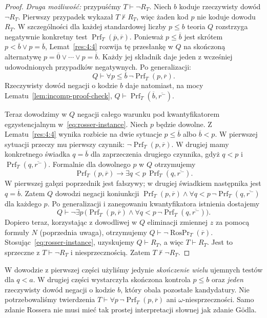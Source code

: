 \begin{proof}
\emph{Druga możliwość:} przypuśćmy $T\vdash\neg R_T$.
Niech $b$ koduje rzeczywisty dowód $\neg R_T$.
Pierwszy przypadek wykazał $T\nvdash R_T$,
więc żaden kod $p$ nie koduje dowodu $R_T$.
W szczególności dla każdej standardowej liczby $p\le b$
teoria $Q$ rozstrzyga negatywnie konkretny test
$\operatorname{Prf}_T(\overline p,\overline r)$.
Ponieważ $p\le\overline b$ jest skrótem
$p<\overline b\lor p=\overline b$, Lemat~\ref{res:4:4}
rozwija tę przesłankę w $Q$ na skończoną alternatywę
$p=\overline0\lor\cdots\lor p=\overline b$.
Każdy jej składnik daje jeden z wcześniej
udowodnionych przypadków negatywnych. Po generalizacji:
\[
Q\vdash\forall p\le\overline b\,
\neg\operatorname{Prf}_T(p,\overline r).
\]
Rzeczywisty dowód negacji o kodzie $b$ daje natomiast,
na mocy Lematu~\ref{lem:incomp-proof-check},
$Q\vdash\operatorname{Prf}_T(\overline b,\overline{r^-})$.

Teraz dowodzimy w $Q$ negacji całego warunku
pod kwantyfikatorem egzystencjalnym w~\eqref{eq:rosser-instance}.
Niech $p$ będzie dowolne. Z Lematu~\ref{res:4:4}
wynika rozbicie na dwie sytuacje
$p\le\overline b$ albo $\overline b<p$.
W pierwszej sytuacji przeczy mu pierwszy czynnik:
$\neg\operatorname{Prf}_T(p,\overline r)$.
W drugiej mamy konkretnego świadka $q=\overline b$
dla zaprzeczenia drugiego czynnika, gdyż
$q<p$ i $\operatorname{Prf}_T(q,\overline{r^-})$.
Formalnie dla dowolnego $p$ w $Q$ otrzymujemy
\[
\operatorname{Prf}_T(p,\overline r)
\longrightarrow
\exists q<p\,\operatorname{Prf}_T(q,\overline{r^-}).
\]
W pierwszej gałęzi poprzednik jest fałszywy; w drugiej
świadkiem następnika jest $q=\overline b$. Zatem $Q$ dowodzi
negacji koniunkcji
$\operatorname{Prf}_T(p,\overline r)\land
\forall q<p\,\neg\operatorname{Prf}_T(q,\overline{r^-})$
dla każdego $p$. Po generalizacji i zanegowaniu kwantyfikatora
istnienia dostajemy
\[
Q\vdash\neg\exists p\,\bigl(
\operatorname{Prf}_T(p,\overline r)\land
\forall q<p\,\neg\operatorname{Prf}_T(q,\overline{r^-})\bigr).
\]
Dopiero teraz, korzystając z dowodliwej w $Q$ eliminacji
zmiennej $z$ za pomocą formuły $N$ (poprzednia uwaga),
otrzymujemy $Q\vdash\neg\operatorname{RosPr}_T(\overline r)$.
Stosując~\eqref{eq:rosser-instance}, uzyskujemy
$Q\vdash R_T$, a więc $T\vdash R_T$.
Jest to sprzeczne z $T\vdash\neg R_T$ i niesprzecznością.
Zatem $T\nvdash\neg R_T$.
\end{proof}

\begin{uwaga}
W dowodzie z pierwszej części użyliśmy jedynie \emph{skończenie wielu}
ujemnych testów dla $q<a$. W drugiej części wystarczyła
skończona kontrola $p\le b$ oraz \emph{jeden} rzeczywisty dowód
negacji o kodzie $b$, który obala pozostałe kandydatury.
Nie potrzebowaliśmy twierdzenia $T\vdash\forall p\,\neg\operatorname{Prf}_T(p,\overline r)$
ani $\omega$-niesprzeczności. Samo zdanie Rossera nie musi
mieć tak prostej interpretacji słownej jak zdanie Gödla.
\end{uwaga}

